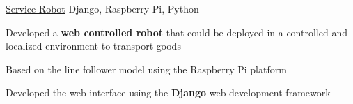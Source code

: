 \begin{cventries}
\projects
   {} %
    {\href{https://github.com/vinx-2105/service_bot}{Service Robot}} %
    {Django, Raspberry Pi, Python} %
    {} %
    {
      \begin{cvitems} %
        \item {Developed a \textbf{web controlled robot} that could be deployed in a controlled and localized environment to transport goods}
        \item {Based on the line follower model using the Raspberry Pi platform}
        \item {Developed the web interface using the \textbf{Django} web development framework}
      \end{cvitems}
    }
  
    

  

 


  


 


\end{cventries}

